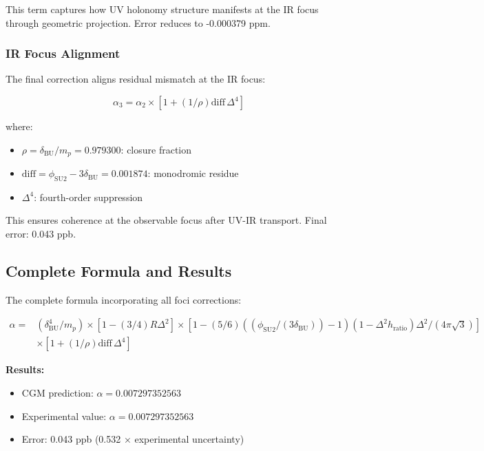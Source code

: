 \documentclass[11pt,a4paper]{article}
\theoremstyle{definition}
\theoremstyle{remark}
\begin{document}
This term captures how UV holonomy structure manifests at the IR focus through geometric projection. Error reduces to -0.000379 ppm.

\subsubsection{IR Focus Alignment}

The final correction aligns residual mismatch at the IR focus:

\begin{equation}
\alpha_3 = \alpha_2 \times [1 + (1/\rho) \mathrm{diff} \, \Delta^4] \tag{5}
\end{equation}

where:
\begin{itemize}
\item $\rho = \delta_{\mathrm{BU}}/m_p = 0.979300$: closure fraction
\item $\mathrm{diff} = \phi_{\mathrm{SU2}} - 3\delta_{\mathrm{BU}} = 0.001874$: monodromic residue
\item $\Delta^4$: fourth-order suppression
\end{itemize}

This ensures coherence at the observable focus after UV-IR transport. Final error: 0.043 ppb.

\subsection{Complete Formula and Results}

The complete formula incorporating all foci corrections:

\begin{align}
\alpha = & (\delta_{\mathrm{BU}}^4 / m_p) \times [1 - (3/4) R \Delta^2] \times \left[1 - (5/6) \left((\phi_{\mathrm{SU2}}/(3\delta_{\mathrm{BU}})) - 1\right) (1 - \Delta^2 h_{\mathrm{ratio}}) \Delta^2 / (4\pi \sqrt{3})\right] \tag{6} \\
& \times [1 + (1/\rho) \mathrm{diff} \, \Delta^4] \nonumber
\end{align}

\textbf{Results:}
\begin{itemize}
\item CGM prediction: $\alpha = 0.007297352563$
\item Experimental value: $\alpha = 0.007297352563$
\item Error: 0.043 ppb (0.532 × experimental uncertainty)
\end{itemize}
\end{document}
